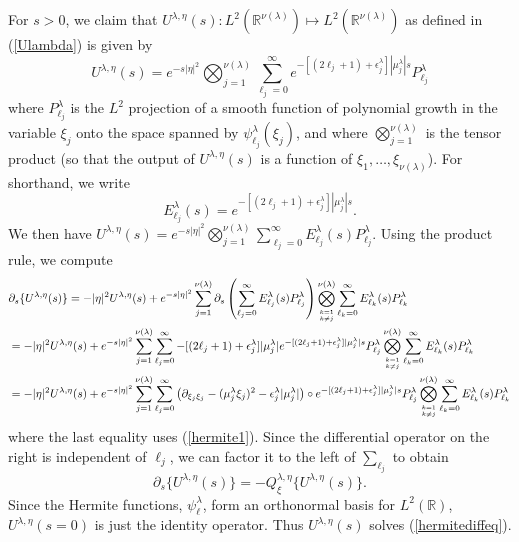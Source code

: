 \documentclass[12pt,reqno]{amsart}
\theoremstyle{definition}
\begin{document}
For $s>0$, we claim that $U^{\lambda,\eta}(s) : L^2 ({\mathbb{R}}^{\nu(\lambda)}) \mapsto L^2({\mathbb{R}}^{\nu(\lambda)}) $ as defined in
(\ref{Ulambda}) is given by
\[
U^{\lambda,\eta}(s) = e^{-s|\eta|^2} \bigotimes_{j=1}^{\nu(\lambda)}
\sum_{\ell_j=0}^\infty e^{-[(2\ell_j+1) + {\epsilon_j^\lambda}]|{\mu^\lambda_j}| s }
P^\lambda_{\ell_j}
\]
where $P^\lambda_{\ell_j} $ is the $L^2$ projection of a smooth
function of polynomial growth in the variable $\xi_j$ onto the 
space spanned by $\psi^\lambda_{\ell_j} (\xi_j)$, and where 
$\bigotimes_{j=1}^{\nu(\lambda)}$ is the tensor product (so that the output
of $U^{\lambda,\eta}(s)$ is a function of $\xi_1, \dots , \xi_{\nu(\lambda)}$).
For shorthand, we write
\[
E^\lambda_{\ell_j} (s)=  e^{-[(2\ell_j+1) + {\epsilon_j^\lambda}]|{\mu^\lambda_j}| s }.
\]
We then have $U^{\lambda,\eta}(s) = e^{-s|\eta|^2} \bigotimes_{j=1}^{\nu(\lambda)} \sum_{\ell_j=0}^\infty E^\lambda_{\ell_j} (s) P^\lambda_{\ell_j} $.
Using the product rule, we compute
\begin{align*}
&{\partial}_s \{U^{\lambda,\eta}(s) \} = - |\eta|^2 U^{\lambda,\eta}(s) + e^{-s|\eta|^2}\sum_{j=1}^{\nu(\lambda)} {\partial}_s \left( \sum_{\ell_j=0}^\infty E^\lambda_{\ell_j} (s) P^\lambda_{\ell_j} \right)
\bigotimes_{{\genfrac{}{}{0pt}{2}{{k=1}}{{k \neq j}}}}^{\nu(\lambda)} \sum_{\ell_k=0}^\infty E^\lambda_{\ell_k} (s) P^\lambda_{\ell_k} \\
&=- |\eta|^2 U^{\lambda,\eta}(s) + e^{-s|\eta|^2}\sum_{j=1}^{\nu(\lambda)}\sum_{\ell_j =0}^\infty -[(2\ell_j+1)+{\epsilon_j^\lambda}]|{\mu^\lambda_j}|   
e^{-[(2\ell_j+1) + {\epsilon_j^\lambda}]|{\mu^\lambda_j}| s } P^\lambda_{\ell_j}
\bigotimes_{{\genfrac{}{}{0pt}{2}{{k=1}}{{k \neq j}}}}^{\nu(\lambda)} \sum_{\ell_k=0}^\infty E^\lambda_{\ell_k} (s) P^\lambda_{\ell_k} \\
&=- |\eta|^2 U^{\lambda,\eta}(s) + e^{-s|\eta|^2}\sum_{j=1}^{\nu(\lambda)} \sum_{\ell_j=0}^\infty  \left({\partial}_{\xi_j \xi_j} - ({\mu^\lambda_j}\xi_j)^2 -
{\epsilon_j^\lambda}|{\mu^\lambda_j}|\right)  \circ 
e^{-[(2\ell_j+1) + {\epsilon_j^\lambda}]|{\mu^\lambda_j}| s } P^\lambda_{\ell_j}
\bigotimes_{{\genfrac{}{}{0pt}{2}{{k=1}}{{k \neq j}}}}^{\nu(\lambda)} \sum_{\ell_k=0}^\infty E^\lambda_{\ell_k} (s) P^\lambda_{\ell_k}
\end{align*}
where the last equality uses (\ref{hermite1}).
Since the differential operator on the right is independent of $\ell_j$,
we can factor it to the left of $\sum_{\ell_j}$ to obtain
\[
{\partial}_s \{ U^{\lambda,\eta}(s) \} = - Q_\xi^{\lambda,\eta} \{U^{\lambda,\eta}(s) \}.
\]
Since the Hermite functions, $\psi^\lambda_\ell$, form an orthonormal 
basis for $L^2({\mathbb{R}})$, $U^{\lambda,\eta}(s=0)$ is just the identity
operator. Thus $U^{\lambda,\eta}(s)$ solves (\ref{hermitediffeq}).
\end{document}
